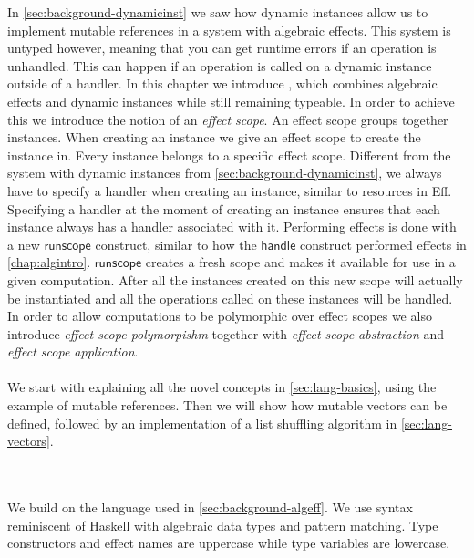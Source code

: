 In \cref{sec:background-dynamicinst} we saw how dynamic instances allow us to implement mutable references in a system with algebraic effects.
This system is untyped however, meaning that you can get runtime errors if an operation is unhandled.
This can happen if an operation is called on a dynamic instance outside of a handler.
In this chapter we introduce \lang{}, which combines algebraic effects and dynamic instances while still remaining typeable.
In order to achieve this we introduce the notion of an \emph{effect scope}.
An effect scope groups together instances.
When creating an instance we give an effect scope to create the instance in.
Every instance belongs to a specific effect scope.
Different from the system with dynamic instances from \cref{sec:background-dynamicinst}, we always have to specify a handler when creating an instance, similar to resources in Eff.
Specifying a handler at the moment of creating an instance ensures that each instance always has a handler associated with it.
Performing effects is done with a new $\mathsf{runscope}$ construct, similar to how the $\mathsf{handle}$ construct performed effects in \cref{chap:algintro}.
$\mathsf{runscope}$ creates a fresh scope and makes it available for use in a given computation.
After all the instances created on this new scope will actually be instantiated and all the operations called on these instances will be handled.
In order to allow computations to be polymorphic over effect scopes we also introduce \emph{effect scope polymorpishm} together with \emph{effect scope abstraction} and \emph{effect scope application}.
\\\\
We start with explaining all the novel concepts in \cref{sec:lang-basics}, using the example of mutable references.
Then we will show how mutable vectors can be defined, followed by an implementation of a list shuffling algorithm in \cref{sec:lang-vectors}.
\iffalse
We end the chapter by showing how our system allows for local effects in Section~3.3.
\fi
\\\\
We build on the language used in \cref{sec:background-algeff}.
We use syntax reminiscent of Haskell with algebraic data types and pattern matching.
Type constructors and effect names are uppercase while type variables are lowercase.

